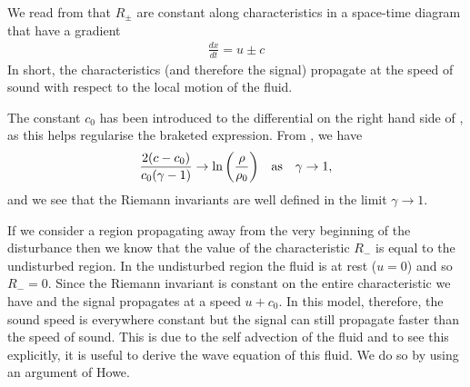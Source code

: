 We read from  that $R_\pm$ are constant along characteristics in a space-time diagram that have a gradient
\begin{align}
\frac{dx}{dt}= u\pm c
\end{align}
In short,
the characteristics (and therefore the signal) propagate at the speed of sound with respect to the local motion of the fluid.

The constant $c_0$ has been introduced to the differential on the right hand side of ,
as this helps regularise the braketed expression.
From , we have 
\begin{align}
  \frac{2(c-c_0)}{c_0(\gamma - 1)} \rightarrow \ln\left( \frac{\rho}{\rho_0} \right) && \text{as} && \gamma\rightarrow 1,
\end{align}
and we see that the Riemann invariants are well defined in the limit $ \gamma\rightarrow 1$.



If we consider a region propagating away from the very beginning of the disturbance then
we know that the value of the characteristic $R_-$ is equal to the undisturbed region.
In the undisturbed region the fluid is at rest ($u=0$) and so $R_- = 0$.
Since the Riemann invariant is constant on the entire characteristic we have
and the signal propagates at a speed $u + c_0$.
%
In this model, therefore, the sound speed is everywhere constant
but the signal can still propagate faster than the speed of sound.
This is due to the self advection of the fluid
and to see this explicitly, it is useful to derive the wave equation of this fluid.
We do so by using an argument of Howe\cite{Howe1998}.
%

